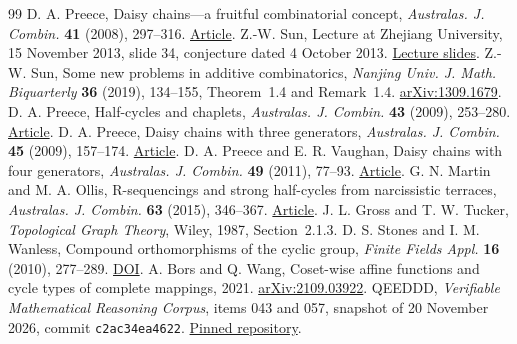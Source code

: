 \documentclass[11pt,a4paper]{article}
\begin{document}
\begin{thebibliography}{99}\small
{} D. A. Preece, Daisy chains---a fruitful combinatorial concept, \emph{Australas. J. Combin.} \textbf{41} (2008), 297--316.
\href{https://ajc.maths.uq.edu.au/pdf/41/ajc_v41_p297.pdf}{Article}.
 Z.-W. Sun, Lecture at Zhejiang University, 15 November 2013, slide 34, conjecture dated 4 October 2013.
\href{https://www.mathnet.ru/PresentFiles/21090/sun.pdf}{Lecture slides}.
 Z.-W. Sun, Some new problems in additive combinatorics, \emph{Nanjing Univ. J. Math. Biquarterly} \textbf{36} (2019), 134--155, Theorem~1.4 and Remark~1.4.
\href{https://arxiv.org/abs/1309.1679}{arXiv:1309.1679}.
 D. A. Preece, Half-cycles and chaplets, \emph{Australas. J. Combin.} \textbf{43} (2009), 253--280.
\href{https://ajc.maths.uq.edu.au/pdf/43/ajc_v43_p253.pdf}{Article}.
 D. A. Preece, Daisy chains with three generators, \emph{Australas. J. Combin.} \textbf{45} (2009), 157--174.
\href{https://ajc.maths.uq.edu.au/pdf/45/ajc_v45_p157.pdf}{Article}.
 D. A. Preece and E. R. Vaughan, Daisy chains with four generators, \emph{Australas. J. Combin.} \textbf{49} (2011), 77--93.
\href{https://ajc.maths.uq.edu.au/pdf/49/ajc_v49_p077.pdf}{Article}.
 G. N. Martin and M. A. Ollis, R-sequencings and strong half-cycles from narcissistic terraces, \emph{Australas. J. Combin.} \textbf{63} (2015), 346--367.
\href{https://ajc.maths.uq.edu.au/pdf/63/ajc_v63_p346.pdf}{Article}.
 J. L. Gross and T. W. Tucker, \emph{Topological Graph Theory}, Wiley, 1987, Section~2.1.3.
 D. S. Stones and I. M. Wanless, Compound orthomorphisms of the cyclic group, \emph{Finite Fields Appl.} \textbf{16} (2010), 277--289.
\href{https://doi.org/10.1016/j.ffa.2010.04.001}{DOI}.
 A. Bors and Q. Wang, Coset-wise affine functions and cycle types of complete mappings, 2021.
\href{https://arxiv.org/abs/2109.03922}{arXiv:2109.03922}.
 QEEDDD, \emph{Verifiable Mathematical Reasoning Corpus}, items 043 and 057, snapshot of 20 November 2026, commit \texttt{c2ac34ea4622}.
\href{https://github.com/QEEDDD/Verifiable-Mathematical-Reasoning-Corpus/tree/c2ac34ea4622778187173f41bb1996deee8081b7}{Pinned repository}.
\end{thebibliography}
\end{document}
